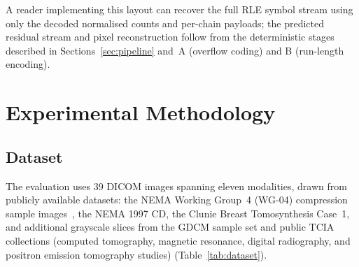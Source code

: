 \documentclass[journal]{IEEEtran}
\begin{document}
A reader implementing this layout can recover the full RLE symbol stream
using only the decoded normalised counts and per-chain payloads; the
predicted residual stream and pixel reconstruction follow from the
deterministic stages described in Sections~\ref{sec:pipeline} and~A
(overflow coding) and B (run-length encoding).

\section{Experimental Methodology}
\label{sec:methodology}

\subsection{Dataset}

The evaluation uses 39 DICOM images spanning eleven modalities, drawn
from publicly available datasets: the NEMA Working Group~4 (WG-04)
compression sample images~\cite{nema_wg04}, the NEMA 1997 CD, the
Clunie Breast Tomosynthesis Case~1, and additional grayscale slices
from the GDCM sample set and public TCIA collections (computed
tomography, magnetic resonance, digital radiography, and positron
emission tomography studies) (Table~\ref{tab:dataset}).
\end{document}
